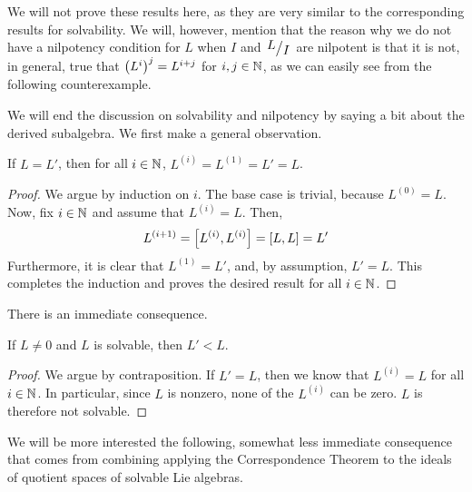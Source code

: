 We will not prove these results here, as they are very similar to the corresponding results for solvability. We will, however, mention that the reason why we do not have a nilpotency condition for $L$ when $I$ and $\quotient{L}{I}$ are nilpotent is that it is not, in general, true that $\left( L^i \right)^j = L^{i + j}$ for $i, j \in \mathbb{N}$, as we can easily see from the following counterexample.

\begin{boxcexample}
    \sorry
\end{boxcexample}

We will end the discussion on solvability and nilpotency by saying a bit about the derived subalgebra. We first make a general observation.

\begin{lemma}\label{Ch1:Lemma:AllDerivsOfDerivEqTop}
    If $L = L'$, then for all $i \in \mathbb{N}$, $L^{(i)} = L^{(1)} = L' = L$.
\end{lemma}
\begin{proof}
    We argue by induction on $i$. The base case is trivial, because $L^{(0)} = L$. Now, fix $i \in \mathbb{N}$ and assume that $L^{(i)} = L$. Then,
    \begin{align*}
        L^{(i + 1)} = \left[ L^{(i)}, L^{(i)} \right] = \left[ L, L \right] = L'
    \end{align*}
    Furthermore, it is clear that $L^{(1)} = L'$, and, by assumption, $L' = L$. This completes the induction and proves the desired result for all $i \in \mathbb{N}$.
\end{proof}

There is an immediate consequence.

\begin{corollary}\label{Ch1:Cor:DerivedSubalgLtOfSolvable}
    If $L \neq 0$ and $L$ is solvable, then $L' < L$.
\end{corollary}
\begin{proof}
    We argue by contraposition. If $L' = L$, then we know that $L^{(i)} = L$ for all $i \in \mathbb{N}$. In particular, since $L$ is nonzero, none of the $L^{(i)}$ can be zero. $L$ is therefore not solvable.
\end{proof}

We will be more interested the following, somewhat less immediate consequence that comes from combining applying the Correspondence Theorem to the ideals of quotient spaces of solvable Lie algebras.

